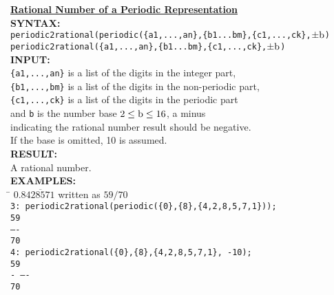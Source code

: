 \begin{tabbing}
  \textbf{\underline{Rational Number of a Periodic Representation}}\\[\baselineskip]
\textbf{SYNTAX:}\\
\hspace{3mm} \= \texttt{periodic2rational(periodic(\{a1,...,an\},\{b1...bm\},\{c1,...,ck\},$\pm{\rm b}$)}\\
   \> \texttt{periodic2rational(\{a1,...,an\},\{b1...bm\},\{c1,...,ck\},$\pm{\rm b}$)}\\[\baselineskip]

\textbf{INPUT:}\\
     \> \texttt{\{a1,...,an\}} is a list of the digits in the integer part,\\
     \> \texttt{\{b1,...,bm\}} is a list of the digits in the non-periodic part,\\
     \>\texttt{\{c1,...,ck\}} is a list of the digits in the periodic part\\
     \> and {\tt b} is the number base $2 \leq {\rm b} \leq 16$, a minus\\
     \> indicating the rational number result should be negative. \\
     \> If the base is omitted, 10 is assumed. \\[\baselineskip]

\textbf{RESULT:}\\
     \> A rational number.\\[\baselineskip]

\textbf{EXAMPLES:}\\[\baselineskip]
\hspace{10mm} \= $0.8\overline{428571}$ written as $59/70$ \\
    \> \texttt{3: periodic2rational(periodic(\{0\},\{8\},\{4,2,8,5,7,1\}));}
\\[\baselineskip]
    \> \hspace{1mm} {\tt 59}\\
    \> {\tt ----}\\
    \> \hspace{1mm} {\tt 70}\\[\baselineskip]
    \> \texttt{4: periodic2rational(\{0\},\{8\},\{4,2,8,5,7,1\}, -10);}
\\[\baselineskip]
    \> \hspace{4mm} \texttt{59}\\
    \> \texttt{- ----}\\
    \> \hspace{4mm} \texttt{70}
\end{tabbing}

